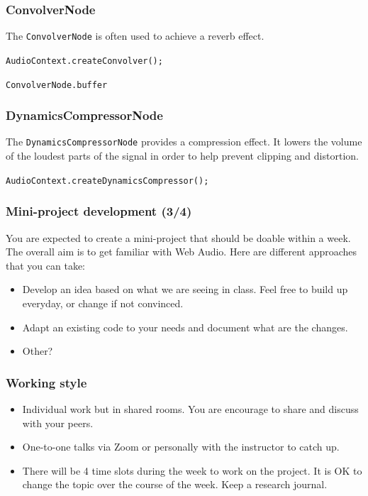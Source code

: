 \documentclass[screen, aspectratio=43]{beamer}
\begin{document}
%
\begin{frame}
\frametitle{ConvolverNode}
The \texttt{ConvolverNode} is often used to achieve a reverb effect.\\
\vspace{10 mm}
\centerline{\texttt{AudioContext.createConvolver();}}
\vspace{2 mm}
\centerline{\texttt{ConvolverNode.buffer}}
\vspace{10 mm}
\end{frame}
%
\begin{frame}
\frametitle{DynamicsCompressorNode}
The \texttt{DynamicsCompressorNode} provides a compression effect. It lowers the volume of the loudest parts of the signal in order to help prevent clipping and distortion.\\
\vspace{10 mm}
\centerline{\texttt{AudioContext.createDynamicsCompressor();}}
\vspace{10 mm}
\end{frame}
%
\begin{frame}
\frametitle{Mini-project development (3/4)}
You are expected to create a mini-project that should be doable within a week. The overall aim is to get familiar with Web Audio. Here are different approaches that you can take:
\begin{itemize}
\item Develop an idea based on what we are seeing in class. Feel free to build up everyday, or change if not convinced.
\item Adapt an existing code to your needs and document what are the changes.
\item Other?
\end{itemize}
\end{frame}
%
\begin{frame}
\frametitle{Working style}
\begin{itemize}
\item Individual work but in shared rooms. You are encourage to share and discuss with your peers.
\item One-to-one talks via Zoom or personally with the instructor to catch up.
\item There will be 4 time slots during the week to work on the project. It is OK to change the topic over the course of the week. Keep a research journal.
\end{itemize}
\end{frame}
\end{document}
